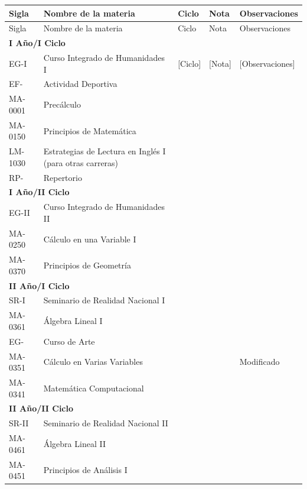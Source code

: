 \begin{longtable}{|p{2cm}|p{7cm}|p{1.6cm}|p{1.6cm}|p{2.8cm}|}
\hline
\rowcolor[HTML]{00C0F3}
Sigla & Nombre de la materia & Ciclo & Nota & Observaciones \\ \hline
\endfirsthead
\hline
\rowcolor[HTML]{00C0F3}
Sigla & Nombre de la materia & Ciclo & Nota & Observaciones \\ \hline
\endhead
\multicolumn{5}{|l|}{\cellcolor[HTML]{E6E6E6}\textbf{I Año/I Ciclo}} \\ \hline
EG-I & Curso Integrado de Humanidades I & [Ciclo] & [Nota] & [Observaciones] \\ \hline
EF- & Actividad Deportiva &  &  &  \\ \hline
MA-0001 & Precálculo &  &  &  \\ \hline
MA-0150 & Principios de Matemática &  &  &  \\ \hline
LM-1030 & Estrategias de Lectura en Inglés I (para otras carreras) &  &  &  \\ \hline
RP- & Repertorio &  &  &  \\ \hline
\multicolumn{5}{|l|}{\cellcolor[HTML]{E6E6E6}\textbf{I Año/II Ciclo}} \\ \hline
EG-II & Curso Integrado de Humanidades II &  &  &  \\ \hline
MA-0250 & Cálculo en una Variable I &  &  &  \\ \hline
MA-0370 & Principios de Geometría &  &  &  \\ \hline
\multicolumn{5}{|l|}{\cellcolor[HTML]{E6E6E6}\textbf{II Año/I Ciclo}} \\ \hline
SR-I & Seminario de Realidad Nacional I &  &  &  \\ \hline
MA-0361 & Álgebra Lineal I &  &  &  \\ \hline
EG- & Curso de Arte &  &  &  \\ \hline
MA-0351 & Cálculo en Varias Variables &  &  & Modificado \\ \hline
MA-0341 & Matemática Computacional &  &  &  \\ \hline
\multicolumn{5}{|l|}{\cellcolor[HTML]{E6E6E6}\textbf{II Año/II Ciclo}} \\ \hline
SR-II & Seminario de Realidad Nacional II &  &  &  \\ \hline
MA-0461 & Álgebra Lineal II &  &  &  \\ \hline
MA-0451 & Principios de Análisis I &  &  &  \\ \hline

\end{longtable}
